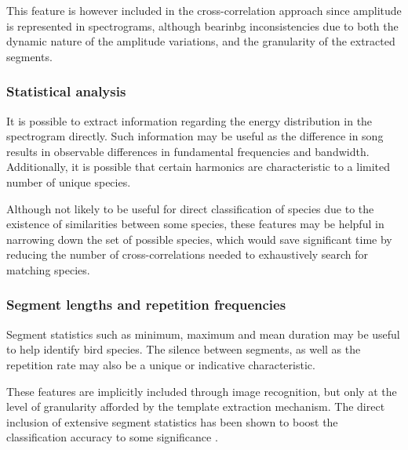 This feature is however included in the cross-correlation approach since
amplitude is represented in spectrograms, although bearinbg inconsistencies due to
both the dynamic nature of the amplitude variations, and the granularity of the
extracted segments.

\subsubsection{Statistical analysis}
It is possible to extract information regarding the energy distribution in the
spectrogram directly.
Such information may be useful as the difference in song results in observable
differences in fundamental frequencies and bandwidth.
Additionally, it is possible that certain harmonics are characteristic to a
limited number of unique species.

Although not likely to be useful for direct classification of species due to the
existence of similarities between some species, these features may be helpful in
narrowing down the set of possible species, which would save significant time by
reducing the number of cross-correlations needed to exhaustively search for
matching species.

\subsubsection{Segment lengths and repetition frequencies}
Segment statistics such as minimum, maximum and mean duration may be useful to
help identify bird species.
The silence between segments, as well as the repetition rate may also be a
unique or indicative characteristic.

These features are implicitly included through image recognition, but only at
the level of granularity afforded by the template extraction mechanism.
The direct inclusion of extensive segment statistics has been shown to boost
the classification accuracy to some significance \parencite{lasseck2013}.
